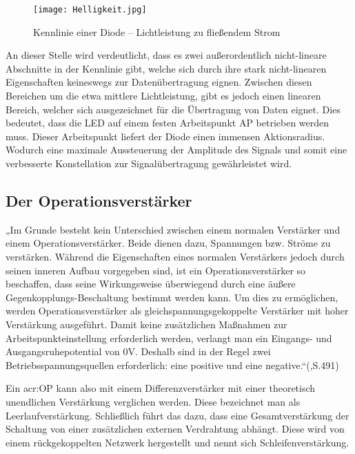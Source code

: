 \begin{figure}[H]
	\centering
	\texttt{[image: Helligkeit.jpg]}
	\caption[Kennlinie einer Diode – Lichtleistung zu fließendem Strom]{Kennlinie einer Diode – Lichtleistung zu fließendem Strom} 
	\cite{Eigen}
	\label{fig:Helligkeit}
\end{figure}

An dieser Stelle wird verdeutlicht, dass es zwei außerordentlich nicht-lineare Abschnitte in der Kennlinie gibt, welche sich durch ihre stark nicht-linearen Eigenschaften keineswegs zur Datenübertragung eignen. Zwischen diesen Bereichen um die etwa mittlere Lichtleistung, gibt es jedoch einen linearen Bereich, welcher sich ausgezeichnet für die Übertragung von Daten eignet. Dies bedeutet, dass die LED auf einem festen Arbeitspunkt AP betrieben werden muss. Dieser Arbeitspunkt liefert der Diode einen immensen Aktionsradius. Wodurch eine maximale Aussteuerung der Amplitude des Signals und somit eine verbesserte Konstellation zur Signalübertragung gewährleistet wird.


\subsection{Der Operationsverstärker}
\label{subsec:Unterabschnitt12}

„Im Grunde besteht kein Unterschied zwischen einem normalen Verstärker und einem Operationsverstärker. Beide dienen dazu, Spannungen bzw. Ströme zu verstärken. Während die Eigenschaften eines normalen Verstärkers jedoch durch seinen inneren Aufbau vorgegeben sind, ist ein Operationsverstärker so beschaffen, dass seine Wirkungsweise überwiegend durch eine äußere Gegenkopplungs-Beschaltung bestimmt werden kann. Um dies zu ermöglichen, werden Operationsverstärker als gleichspannungsgekoppelte Verstärker mit hoher Verstärkung ausgeführt. Damit keine zusätzlichen Maßnahmen zur Arbeitspunkteinstellung erforderlich werden, verlangt man ein Eingangs- und Ausgangsruhepotential von 0V. Deshalb sind in der Regel zwei Betriebsspannungsquellen erforderlich: eine positive und eine negative.“(\cite{tietzeElectronicCircuits2008},S.491)

Ein \gls{acr:OP} kann also mit einem Differenzverstärker mit einer theoretisch unendlichen Verstärkung verglichen werden. Diese bezeichnet man als Leerlaufverstärkung. Schließlich führt das dazu, dass eine Gesamtverstärkung der Schaltung von einer zusätzlichen externen Verdrahtung abhängt. Diese wird von einem rückgekoppelten Netzwerk hergestellt und nennt sich Schleifenverstärkung.\cite{lutzHalbleiterLeistungsbauelemente2012}

